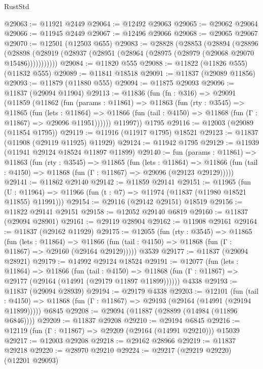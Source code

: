 \begin{lexlean}{RustStd}
\begin{coremodule}
@29063 := @11921 @2449
@29064 := @12492 @29063
@29065 := @29062 @29064
@29066 := @11945 @2449
@29067 := @12496 @29066
@29068 := @29065 @29067
@29070 := @12501 (@12503 @655)
@29083 := @28828
    (@28853
      (@28894
        (@28896
          (@28898 (@28919 (@28937 (@28951 (@28964 (@28975 (@28979 (@29068 @29070 @15486)))))))))))
@29084 := @11820 @555
@29088 := @11822 (@11826 @555) (@11832 @555)
@29089 := @11841 @18518
@29091 := @11837 (@29089 @11856)
@29093 := @11879 (@11880 @555)
@29094 := @11875 @29093
@29096 := @11837 (@29094 @11904)
@29113 := @11836
    (fun (fn : @316) =>
    @29091
      (@11859
        (@11862
          (fun (params : @11861) =>
          @11863
            (fun (rty : @3545) =>
            @11865
              (fun (lets : @11864) =>
              @11866 (fun (tail : @4150) => @11868 (fun (Γ : @11867) => @29096 @11951))))))
        @11997))
    @1795
@29116 := @12003 (@29089 (@11854 @1795))
@29119 := @11916 (@11917 @1795) @18521
@29123 := @11837 (@11908 (@29119 @11925) @11929)
@29124 := @11942 @1795
@29129 := @11939 (@11941 @29124 @18524 @11897 @11899)
@29140 := fun (params : @11861) =>
  @11863
    (fun (rty : @3545) =>
    @11865
      (fun (lets : @11864) =>
      @11866 (fun (tail : @4150) => @11868 (fun (Γ : @11867) => @29096 (@29123 @29129)))))
@29141 := @11862 @29140
@29142 := @11859 @29141
@29151 := @11965
    (fun (U : @11964) => @11966 (fun (t : @7) => @11974 (@11837 (@11980 @18521 @11855) @11991)))
@29154 := @29116 (@29142 @29151) @18519
@29156 := @11822 @29141 @29151
@29158 := @12052 @29140 @6819
@29160 := @11837 (@29094 @28901)
@29161 := @29119 @28904
@29162 := @11908 @29161
@29164 := @11837 (@29162 @11929)
@29175 := @12055
    (fun (rty : @3545) =>
    @11865
      (fun (lets : @11864) =>
      @11866 (fun (tail : @4150) => @11868 (fun (Γ : @11867) => @29160 (@29164 @29129)))))
    @3539
@29177 := @11837 (@29094 @28921)
@29179 := @14992 @29124 @18524
@29191 := @12077
    (fun (lets : @11864) =>
    @11866
      (fun (tail : @4150) =>
      @11868 (fun (Γ : @11867) => @29177 (@29164 (@14991 (@29179 @11897 @11899))))))
    @4338
@29193 := @11837 (@29094 @28939)
@29194 := @29179 @4338
@29203 := @12101
    (fun (tail : @4150) => @11868 (fun (Γ : @11867) => @29193 (@29164 (@14991 (@29194 @11899)))))
    @6845
@29208 := @29094 (@11887 (@28899 (@14984 (@11896 @6846))))
@29209 := @11837 @29208
@29210 := @29194 @6845
@29216 := @12119 (fun (Γ : @11867) => @29209 (@29164 (@14991 @29210))) @15039
@29217 := @12003 @29208
@29218 := @29162 @28966
@29219 := @11837 @29218
@29220 := @28970 @29210
@29224 := @29217 (@29219 @29220) (@12201 @29093)

\end{coremodule}
\end{lexlean}
